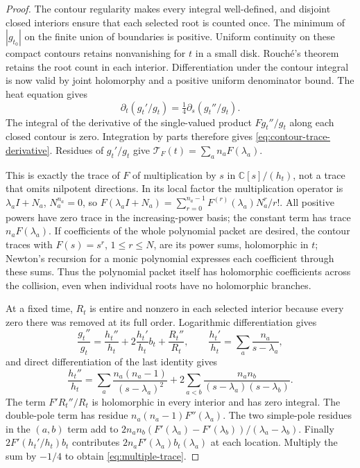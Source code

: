 \documentclass[11pt]{article}
\newcommand{\C}{\mathbb C}\newcommand{\R}{\mathbb R}
\begin{document}
\begin{proof}
The contour regularity makes every integral well-defined, and
disjoint closed interiors ensure that each selected root is counted
once. The minimum of $|g_{t_0}|$ on the finite union of boundaries is
positive. Uniform continuity on these compact contours retains
nonvanishing for $t$ in a small disk. Rouch\'e's theorem retains
the root count in each interior. Differentiation under the contour
integral is now valid by joint holomorphy and a positive uniform
denominator bound. The heat equation gives
\[
\partial_t(g_t'/g_t)
=\tfrac14\partial_s(g_t''/g_t).
\]
The integral of the derivative of the single-valued product
$F g_t''/g_t$ along each closed contour is zero. Integration by
parts therefore gives \eqref{eq:contour-trace-derivative}.
Residues of $g_t'/g_t$ give
$\mathscr T_F(t)=\sum_a n_aF(\lambda_a)$.

This is exactly the trace of $F$ of multiplication by $s$ in
$\C[s]/(h_t)$, not a trace that omits nilpotent directions.
In its local factor the multiplication operator is
$\lambda_a I+N_a$, $N_a^{n_a}=0$, so
$F(\lambda_a I+N_a)=\sum_{r=0}^{n_a-1}
F^{(r)}(\lambda_a)N_a^r/r!$.
All positive powers have zero trace in the increasing-power basis;
the constant term has trace $n_aF(\lambda_a)$.
If coefficients of the whole polynomial packet are desired, the
contour traces with $F(s)=s^r$, $1\leq r\leq N$, are its power
sums, holomorphic in $t$; Newton's recursion for a monic polynomial
expresses each coefficient through these sums. Thus the polynomial
packet itself has holomorphic coefficients across the collision,
even when individual roots have no holomorphic branches.

At a fixed time, $R_t$ is entire and nonzero in each selected
interior because every zero there was removed at its full order.
Logarithmic differentiation gives
\[
\frac{g_t''}{g_t}=\frac{h_t''}{h_t}
+2\frac{h_t'}{h_t}b_t+\frac{R_t''}{R_t},\qquad
\frac{h_t'}{h_t}=\sum_a\frac{n_a}{s-\lambda_a},
\]
and direct differentiation of the last identity gives
\[
\frac{h_t''}{h_t}
=\sum_a\frac{n_a(n_a-1)}{(s-\lambda_a)^2}
+2\sum_{a<b}\frac{n_an_b}{(s-\lambda_a)(s-\lambda_b)}.
\]
The term $F'R_t''/R_t$ is holomorphic in every interior and has
zero integral. The double-pole term has residue
$n_a(n_a-1)F''(\lambda_a)$. The two simple-pole residues in the
$(a,b)$ term add to
$2n_an_b(F'(\lambda_a)-F'(\lambda_b))/(\lambda_a-\lambda_b)$.
Finally $2F'(h_t'/h_t)b_t$ contributes
$2n_aF'(\lambda_a)b_t(\lambda_a)$ at each location.
Multiply the sum by $-1/4$ to obtain \eqref{eq:multiple-trace}.
\end{proof}
\end{document}
